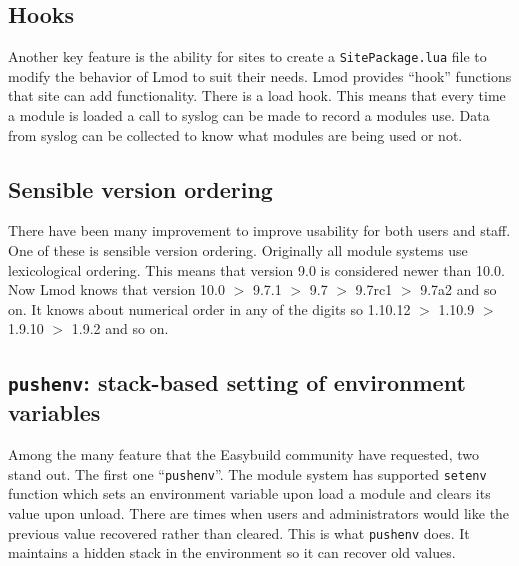 \subsection{Hooks}

Another key feature is the ability for sites to create a
\texttt{SitePackage.lua} file to modify the behavior of Lmod to suit
their needs.  Lmod provides ``hook'' functions that site can add
functionality.  There is a load hook.  This means that
every time a module is loaded a call to syslog can be
made to record a modules use.  Data from syslog can be collected to
know what modules are being used or not.

\subsection{Sensible version ordering}

There have been many improvement to improve usability for both users
and staff.  One of these is sensible version ordering.  Originally all
module systems use lexicological ordering.  This means that version
9.0 is considered newer than 10.0.  Now Lmod knows that version 10.0 $>$
9.7.1 $>$ 9.7 $>$ 9.7rc1 $>$ 9.7a2 and so on.  It knows about
numerical order in any of the digits so 1.10.12 $>$ 1.10.9 $>$ 1.9.10 $>$ 1.9.2
and so on.


\subsection{\texttt{pushenv}: stack-based setting of environment variables}

Among the many feature that the Easybuild community have requested,
two stand out.  The first one ``\texttt{pushenv}''.  The module system
has supported \texttt{setenv} function which sets an environment variable
upon load a module and clears its value upon unload.  There are times
when users and administrators would like the previous value recovered
rather than cleared.  This is what \texttt{pushenv} does.  It
maintains a hidden stack in the environment so it can recover old
values.

